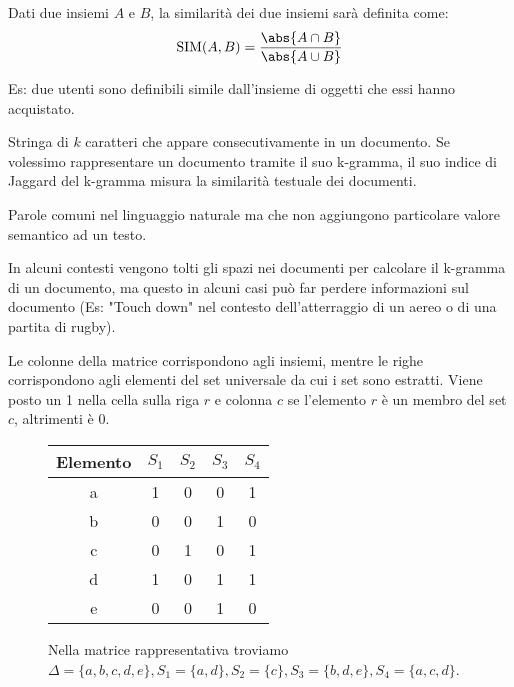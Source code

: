 \documentclass[\main/main.tex]{subfiles}
\begin{document}
\begin{definition}
Dati due insiemi $A$ e $B$, la similarità dei due insiemi sarà definita come:
\[
	\text{SIM}(A, B) = \dfrac{\abs{A \cap B}}{\abs{A \cup B}}
\]
\end{definition}

Es: due utenti sono definibili simile dall'insieme di oggetti che essi hanno acquistato.

\begin{definition}
Stringa di $k$ caratteri che appare consecutivamente in un documento. Se volessimo rappresentare un documento tramite il suo k-gramma, il suo indice di Jaggard del k-gramma misura la similarità testuale dei documenti.
\end{definition}

\begin{definition}
Parole comuni nel linguaggio naturale ma che non aggiungono particolare valore semantico ad un testo.
\end{definition}

In alcuni contesti vengono tolti gli spazi nei documenti per calcolare il k-gramma di un documento, ma questo in alcuni casi può far perdere informazioni sul documento (Es: "Touch down" nel contesto dell'atterraggio di un aereo o di una partita di rugby).

\begin{definition}
Le colonne della matrice corrispondono agli insiemi, mentre le righe corrispondono agli elementi del set universale da cui i set sono estratti. Viene posto un 1 nella cella sulla riga $r$ e colonna $c$ se l'elemento $r$ è un membro del set $c$, altrimenti è 0.

\begin{figure}[H]
\begin{center}
\begin{tabular}{c|c|c|c|c}
Elemento & $S_1$ & $S_2$ & $S_3$ & $S_4$ \\
\hline
\hline
a & 1 & 0&0&1\\
b & 0 &0&1&0\\
c & 0 &1&0&1\\
d & 1 &0&1&1\\
e & 0 &0&1&0\\
\end{tabular}
\end{center}
\caption{Nella matrice rappresentativa troviamo $\Delta = \{a,b,c,d,e\}, S_1 = \{a,d\}, S_2 = \{c\}, S_3 = \{b,d,e\}, S_4 = \{a,c,d\}$.}
\end{figure}
\end{definition}
\end{document}
